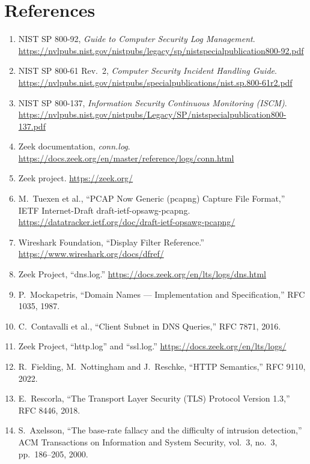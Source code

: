 \section{References}
\label{sec:references}

\begin{enumerate}
  \item NIST SP 800-92, \emph{Guide to Computer Security Log Management}. \url{https://nvlpubs.nist.gov/nistpubs/legacy/sp/nistspecialpublication800-92.pdf}
  \item NIST SP 800-61 Rev.\ 2, \emph{Computer Security Incident Handling Guide}. \url{https://nvlpubs.nist.gov/nistpubs/specialpublications/nist.sp.800-61r2.pdf}
  \item NIST SP 800-137, \emph{Information Security Continuous Monitoring (ISCM)}. \url{https://nvlpubs.nist.gov/nistpubs/Legacy/SP/nistspecialpublication800-137.pdf}
  \item Zeek documentation, \emph{conn.log}. \url{https://docs.zeek.org/en/master/reference/logs/conn.html}
  \item Zeek project. \url{https://zeek.org/}
  \item \label{src:pcapng} M.~Tuexen et al., ``PCAP Now Generic (pcapng) Capture File Format,'' IETF Internet-Draft draft-ietf-opsawg-pcapng. \url{https://datatracker.ietf.org/doc/draft-ietf-opsawg-pcapng/}
  \item \label{src:wireshark-df} Wireshark Foundation, ``Display Filter Reference.'' \url{https://www.wireshark.org/docs/dfref/}
  \item \label{src:zeek-dns} Zeek Project, ``dns.log.'' \url{https://docs.zeek.org/en/lts/logs/dns.html}
  \item \label{src:rfc1035} P.~Mockapetris, ``Domain Names --- Implementation and Specification,'' RFC 1035, 1987.
  \item \label{src:rfc7871} C.~Contavalli et al., ``Client Subnet in DNS Queries,'' RFC 7871, 2016.
  \item \label{src:zeek-http} Zeek Project, ``http.log'' and ``ssl.log.'' \url{https://docs.zeek.org/en/lts/logs/}
  \item \label{src:rfc9110} R.~Fielding, M.~Nottingham and J.~Reschke, ``HTTP Semantics,'' RFC 9110, 2022.
  \item \label{src:rfc8446} E.~Rescorla, ``The Transport Layer Security (TLS) Protocol Version 1.3,'' RFC 8446, 2018.
  \item \label{src:axelsson} S.~Axelsson, ``The base-rate fallacy and the difficulty of intrusion detection,'' ACM Transactions on Information and System Security, vol.~3, no.~3, pp.~186--205, 2000.

\end{enumerate}
